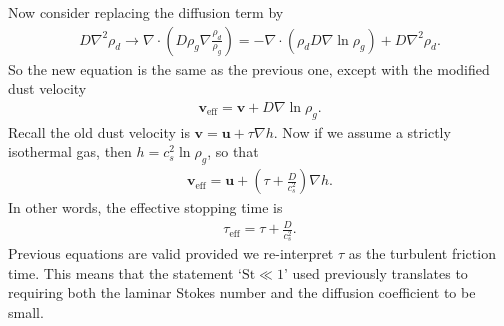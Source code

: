 \documentclass[12pt]{article} %
\begin{document}
Now consider replacing the diffusion term by 
\begin{align}
D\nabla^2\rho_d \to \nabla\cdot\left(D\rho_g\nabla\frac{\rho_d}{\rho_g}\right) 
= -\nabla\cdot\left(\rho_d D\nabla\ln{\rho_g}\right) + D\nabla^2\rho_d.
\end{align}
So the new equation is the same as the previous one, except with the modified dust velocity
\begin{align}
\bm{v}_\mathrm{eff} =\bm{v} + D\nabla\ln{\rho_g}. 
\end{align}
Recall the old dust velocity is $\bm{v} = \bm{u} + \tau\nabla h$. Now if we assume a strictly isothermal gas, then $h=c_s^2\ln\rho_g$, so that
\begin{align}
\bm{v}_\mathrm{eff} =\bm{u}  +\left(\tau +\frac{D}{c_s^2}\right)\nabla h.   
\end{align}
In other words, the effective stopping time is
\begin{align}
\tau_\mathrm{eff} = \tau + \frac{D}{c_s^2}.
\end{align}
Previous equations are valid provided we re-interpret $\tau$ as the turbulent friction time. This means that the statement `$\mathrm{St}\ll1$' used previously translates to requiring both the laminar Stokes number and the diffusion coefficient to be small. 
\end{document}

